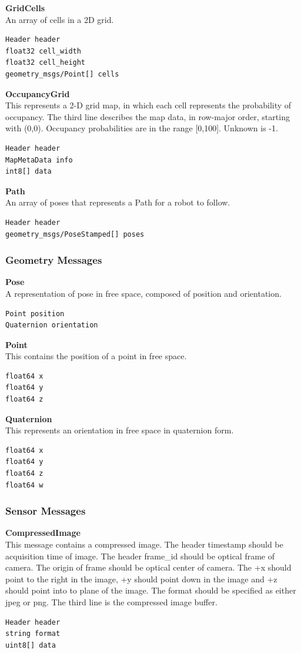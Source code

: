 \documentclass[twoside]{article}
\begin{document}
\textbf{GridCells} \\
An array of cells in a 2D grid.
\begin{verbatim}
Header header
float32 cell_width
float32 cell_height
geometry_msgs/Point[] cells
\end{verbatim}

\textbf{OccupancyGrid} \\
This represents a 2-D grid map, in which each cell represents the probability of occupancy. The third line describes the map data, in row-major order, starting with (0,0). Occupancy probabilities are in the range [0,100]. Unknown is -1.
\begin{verbatim}
Header header
MapMetaData info
int8[] data
\end{verbatim}

\textbf{Path} \\
An array of poses that represents a Path for a robot to follow.
\begin{verbatim}
Header header
geometry_msgs/PoseStamped[] poses
\end{verbatim}

\subsubsection{Geometry Messages}

\textbf{Pose} \\
A representation of pose in free space, composed of position and orientation.
\begin{verbatim}
Point position
Quaternion orientation
\end{verbatim}

\textbf{Point} \\
This contains the position of a point in free space.
\begin{verbatim}
float64 x
float64 y
float64 z
\end{verbatim}

\textbf{Quaternion} \\
This represents an orientation in free space in quaternion form.
\begin{verbatim}
float64 x
float64 y
float64 z
float64 w
\end{verbatim}

\subsubsection{Sensor Messages}

\textbf{CompressedImage} \\
This message contains a compressed image. The header timestamp should be acquisition time of image. The header frame\_id should be optical frame of camera. The origin of frame should be optical center of camera. The +x should point to the right in the image, +y should point down in the image and +z should point into to plane of the image. The format should be specified as either jpeg or png. The third line is the compressed image buffer.
\begin{verbatim}
Header header
string format
uint8[] data
\end{verbatim}
\end{document}
